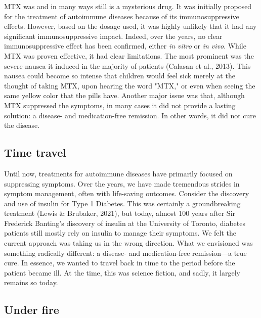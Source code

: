 \documentclass[authordate, editorial]{jote-new-article}
\begin{document}
	MTX was and in many ways still is a mysterious drug. It was initially proposed for the treatment of autoimmune diseases because of its immunosuppressive effects. However, based on the dosage used, it was highly unlikely that it had any significant immunosuppressive impact. Indeed, over the years, no clear immunosuppressive effect has been confirmed, either \emph{in vitro} or \emph{in vivo}. While MTX was proven effective, it had clear limitations. The most prominent was the severe nausea it induced in the majority of patients (Calasan et al., 2013). This nausea could become so intense that children would feel sick merely at the thought of taking MTX, upon hearing the word "MTX," or even when seeing the same yellow color that the pills have. Another major issue was that, although MTX suppressed the symptoms, in many cases it did not provide a lasting solution: a disease- and medication-free remission. In other words, it did not cure the disease.







	\subsection{Time travel}



	Until now, treatments for autoimmune diseases have primarily focused on suppressing symptoms. Over the years, we have made tremendous strides in symptom management, often with life-saving outcomes. Consider the discovery and use of insulin for Type 1 Diabetes. This was certainly a groundbreaking treatment (Lewis \& Brubaker, 2021), but today, almost 100 years after Sir Frederick Banting's discovery of insulin at the University of Toronto, diabetes patients still mostly rely on insulin to manage their symptoms. We felt the current approach was taking us in the wrong direction. What we envisioned was something radically different: a disease- and medication-free remission—a true cure. In essence, we wanted to travel back in time to the period before the patient became ill. At the time, this was science fiction, and sadly, it largely remains so today.







	\subsection{Under fire}
\end{document}
